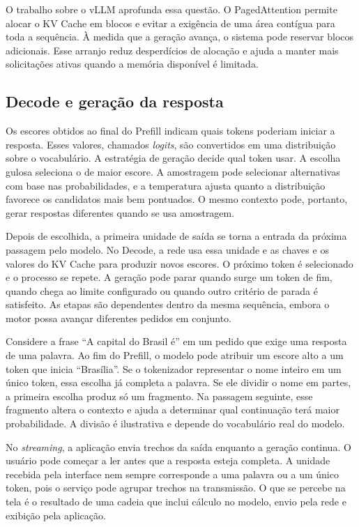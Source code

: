 \documentclass[12pt,a4paper]{article}
\begin{document}
O trabalho sobre o vLLM aprofunda essa questão. O PagedAttention permite alocar o KV Cache em blocos e evitar a exigência de uma área contígua para toda a sequência. À medida que a geração avança, o sistema pode reservar blocos adicionais. Esse arranjo reduz desperdícios de alocação e ajuda a manter mais solicitações ativas quando a memória disponível é limitada.

\subsection{Decode e geração da resposta}

Os escores obtidos ao final do Prefill indicam quais tokens poderiam iniciar a resposta. Esses valores, chamados \textit{logits}, são convertidos em uma distribuição sobre o vocabulário. A estratégia de geração decide qual token usar. A escolha gulosa seleciona o de maior escore. A amostragem pode selecionar alternativas com base nas probabilidades, e a temperatura ajusta quanto a distribuição favorece os candidatos mais bem pontuados. O mesmo contexto pode, portanto, gerar respostas diferentes quando se usa amostragem.

Depois de escolhida, a primeira unidade de saída se torna a entrada da próxima passagem pelo modelo. No Decode, a rede usa essa unidade e as chaves e os valores do KV Cache para produzir novos escores. O próximo token é selecionado e o processo se repete. A geração pode parar quando surge um token de fim, quando chega ao limite configurado ou quando outro critério de parada é satisfeito. As etapas são dependentes dentro da mesma sequência, embora o motor possa avançar diferentes pedidos em conjunto.

Considere a frase ``A capital do Brasil é'' em um pedido que exige uma resposta de uma palavra. Ao fim do Prefill, o modelo pode atribuir um escore alto a um token que inicia ``Brasília''. Se o tokenizador representar o nome inteiro em um único token, essa escolha já completa a palavra. Se ele dividir o nome em partes, a primeira escolha produz só um fragmento. Na passagem seguinte, esse fragmento altera o contexto e ajuda a determinar qual continuação terá maior probabilidade. A divisão é ilustrativa e depende do vocabulário real do modelo.

No \textit{streaming}, a aplicação envia trechos da saída enquanto a geração continua. O usuário pode começar a ler antes que a resposta esteja completa. A unidade recebida pela interface nem sempre corresponde a uma palavra ou a um único token, pois o serviço pode agrupar trechos na transmissão. O que se percebe na tela é o resultado de uma cadeia que inclui cálculo no modelo, envio pela rede e exibição pela aplicação.
\end{document}
